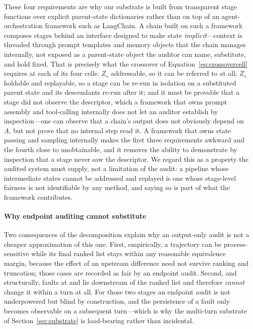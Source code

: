 These four requirements are why our substrate is built from transparent stage functions over
explicit parent-state dictionaries rather than on top of an agent-orchestration framework such as
LangChain. A chain built on such a framework composes stages behind an interface designed to make
state \emph{implicit}---context is threaded through prompt templates and memory objects that the
chain manages internally, not exposed as a parent-state object the auditor can name, substitute,
and hold fixed. That is precisely what the crossover of Equation~\eqref{eq:crossovercell} requires
at each of its four cells: $Z_s$ addressable, so it can be referred to at all; $Z_s$ holdable and
replayable, so a stage can be re-run in isolation on a substituted parent state and its descendants
re-run after it; and it must be provable that a stage did not observe the descriptor, which a
framework that owns prompt assembly and tool-calling internally does not let an auditor establish
by inspection---one can observe that a chain's output does not obviously depend on $A$, but not
prove that no internal step read it. A framework that owns state passing and sampling internally
makes the first three requirements awkward and the fourth close to unobtainable, and it removes the
ability to demonstrate by inspection that a stage never saw the descriptor. We regard this as a
property the audited system must supply, not a limitation of the audit: a pipeline whose
intermediate states cannot be addressed and replayed is one whose stage-level fairness is not
identifiable by any method, and saying so is part of what the framework contributes.

\paragraph{Why endpoint auditing cannot substitute}
Two consequences of the decomposition explain why an output-only audit is not a cheaper
approximation of this one. First, empirically, a trajectory can be process-sensitive while its
final ranked list stays within any reasonable equivalence margin, because the effect of an
upstream difference need not survive ranking and truncation; those cases are recorded as fair by
an endpoint audit. Second, and structurally, faults at  and  lie
downstream of the ranked list and therefore \emph{cannot} change it within a turn at all. For
those two stages an endpoint audit is not underpowered but blind by construction, and the
persistence of a  fault only becomes observable on a subsequent turn---which is why
the multi-turn substrate of Section~\ref{sec:substrate} is load-bearing rather than incidental.

